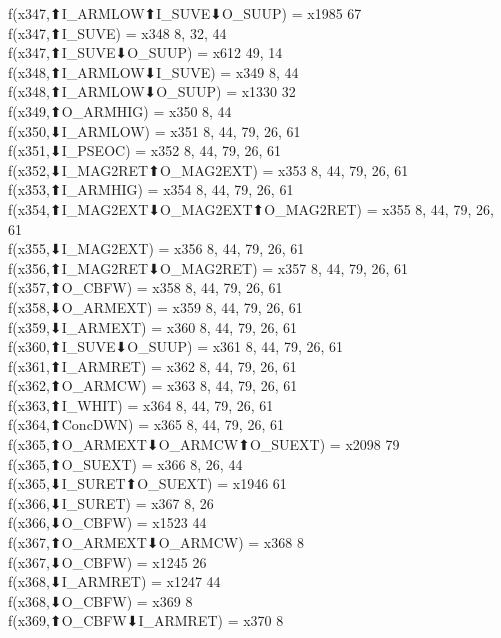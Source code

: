 f(x347,⬆I_ARMLOW⬆I_SUVE⬇O_SUUP) = x1985 {67} \\
f(x347,⬆I_SUVE) = x348 {8, 32, 44} \\
f(x347,⬆I_SUVE⬇O_SUUP) = x612 {49, 14} \\
f(x348,⬆I_ARMLOW⬇I_SUVE) = x349 {8, 44} \\
f(x348,⬆I_ARMLOW⬇O_SUUP) = x1330 {32} \\
f(x349,⬆O_ARMHIG) = x350 {8, 44} \\
f(x350,⬇I_ARMLOW) = x351 {8, 44, 79, 26, 61} \\
f(x351,⬇I_PSEOC) = x352 {8, 44, 79, 26, 61} \\
f(x352,⬇I_MAG2RET⬆O_MAG2EXT) = x353 {8, 44, 79, 26, 61} \\
f(x353,⬆I_ARMHIG) = x354 {8, 44, 79, 26, 61} \\
f(x354,⬆I_MAG2EXT⬇O_MAG2EXT⬆O_MAG2RET) = x355 {8, 44, 79, 26, 61} \\
f(x355,⬇I_MAG2EXT) = x356 {8, 44, 79, 26, 61} \\
f(x356,⬆I_MAG2RET⬇O_MAG2RET) = x357 {8, 44, 79, 26, 61} \\
f(x357,⬆O_CBFW) = x358 {8, 44, 79, 26, 61} \\
f(x358,⬇O_ARMEXT) = x359 {8, 44, 79, 26, 61} \\
f(x359,⬇I_ARMEXT) = x360 {8, 44, 79, 26, 61} \\
f(x360,⬆I_SUVE⬇O_SUUP) = x361 {8, 44, 79, 26, 61} \\
f(x361,⬆I_ARMRET) = x362 {8, 44, 79, 26, 61} \\
f(x362,⬆O_ARMCW) = x363 {8, 44, 79, 26, 61} \\
f(x363,⬆I_WHIT) = x364 {8, 44, 79, 26, 61} \\
f(x364,⬆ConcDWN) = x365 {8, 44, 79, 26, 61} \\
f(x365,⬆O_ARMEXT⬇O_ARMCW⬆O_SUEXT) = x2098 {79} \\
f(x365,⬆O_SUEXT) = x366 {8, 26, 44} \\
f(x365,⬇I_SURET⬆O_SUEXT) = x1946 {61} \\
f(x366,⬇I_SURET) = x367 {8, 26} \\
f(x366,⬇O_CBFW) = x1523 {44} \\
f(x367,⬆O_ARMEXT⬇O_ARMCW) = x368 {8} \\
f(x367,⬇O_CBFW) = x1245 {26} \\
f(x368,⬇I_ARMRET) = x1247 {44} \\
f(x368,⬇O_CBFW) = x369 {8} \\
f(x369,⬆O_CBFW⬇I_ARMRET) = x370 {8} \\
